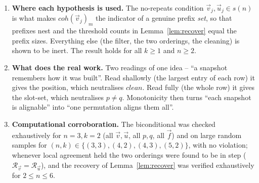 \begin{enumerate}
\item \textbf{Where each hypothesis is used.}  The no-repeats condition
$\vec v_j,\vec u_j\in s(n)$ is what makes $coh(\vec v_j)_m$ the indicator of a
genuine prefix \emph{set}, so that prefixes nest and the threshold counts in
Lemma~\ref{lem:recover} equal the prefix sizes.  Everything else (the filter, the
two orderings, the cleaning) is shown to be inert.  The result holds for all
$k\ge1$ and $n\ge2$.

\item \textbf{What does the real work.}  Two readings of one idea -- ``a snapshot
remembers how it was built''.  Read shallowly (the largest entry of each row) it
gives the position, which neutralises $clean$.  Read fully (the whole row) it gives
the slot-set, which neutralises $p\neq q$.  Monotonicity then turns ``each snapshot
is alignable'' into ``one permutation aligns them all''.

\item \textbf{Computational corroboration.}  The biconditional was checked
exhaustively for $n=3,k=2$ (all $\vec v,\vec u$, all $p,q$, all $\vec f$) and on
large random samples for $(n,k)\in\{(3,3),(4,2),(4,3),(5,2)\}$, with no violation;
whenever local agreement held the two orderings were found to be in step
($\mathcal R_{\vec v}=\mathcal R_{\vec u}$), and the recovery of
Lemma~\ref{lem:recover} was verified exhaustively for $2\le n\le 6$.
\end{enumerate}


